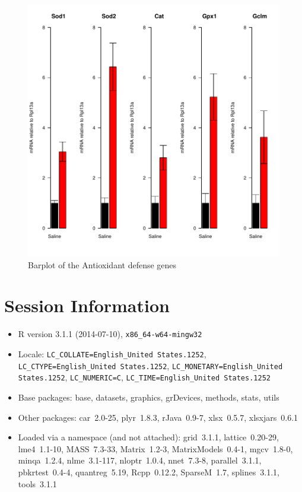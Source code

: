 \documentclass{article}
\begin{document}
\begin{figure}
\begin{center}
\includegraphics{MaternalParticulateAntioxDefense-barplot-combined}
\end{center}
\caption{Barplot of the Antioxidant defense genes}
\label{fig:barplot-combined}
\end{figure}

\section*{Session Information}
\begin{itemize}\raggedright
  \item R version 3.1.1 (2014-07-10), \verb|x86_64-w64-mingw32|
  \item Locale: \verb|LC_COLLATE=English_United States.1252|, \verb|LC_CTYPE=English_United States.1252|, \verb|LC_MONETARY=English_United States.1252|, \verb|LC_NUMERIC=C|, \verb|LC_TIME=English_United States.1252|
  \item Base packages: base, datasets, graphics, grDevices, methods,
    stats, utils
  \item Other packages: car~2.0-25, plyr~1.8.3, rJava~0.9-7,
    xlsx~0.5.7, xlsxjars~0.6.1
  \item Loaded via a namespace (and not attached): grid~3.1.1,
    lattice~0.20-29, lme4~1.1-10, MASS~7.3-33, Matrix~1.2-3,
    MatrixModels~0.4-1, mgcv~1.8-0, minqa~1.2.4, nlme~3.1-117,
    nloptr~1.0.4, nnet~7.3-8, parallel~3.1.1, pbkrtest~0.4-4,
    quantreg~5.19, Rcpp~0.12.2, SparseM~1.7, splines~3.1.1, tools~3.1.1
\end{itemize}
\end{document}
